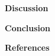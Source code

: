 \documentclass[10pt,a4paper]{article}
\begin{document}
\newpage
{\LARGE\bf
Discussion
}





\newpage
{\LARGE\bf
Conclusion
}









\newpage
{\LARGE\bf
References
}
\end{document}
